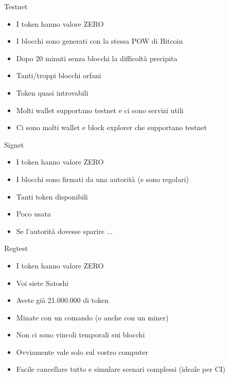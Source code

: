 \documentclass[aspectratio=169]{beamer}
\begin{document}
\begin{frame}{Testnet}
    \begin{itemize}
        \item I token hanno valore ZERO
        \item I blocchi sono generati con la stessa POW di Bitcoin
        \item Dopo 20 minuti senza blocchi la difficoltà precipita
        \item Tanti/troppi blocchi orfani
        \item Token quasi introvabili
        \item Molti wallet supportano testnet e ci sono servizi utili
        \item Ci sono molti wallet e block explorer che supportano testnet
    \end{itemize}

\end{frame}

\begin{frame}{Signet}
    \begin{itemize}
        \item I token hanno valore ZERO
        \item I blocchi sono firmati da una autorità (e sono regolari)
        \item Tanti token disponibili
        \item Poco usata
        \item Se l'autorità dovesse sparire ...
    \end{itemize}
\end{frame}

\begin{frame}{Regtest}
    \begin{itemize}
        \item I token hanno valore ZERO
        \item Voi siete Satoshi 
        \item Avete già 21.000.000 di token
        \item Minate con un comando (o anche con un miner)
        \item Non ci sono vincoli temporali sui blocchi
        \item Ovviamente vale solo sul vostro computer
        \item Facile cancellare tutto e simulare scenari complessi (ideale per CI)
    \end{itemize}
\end{frame}
\end{document}
